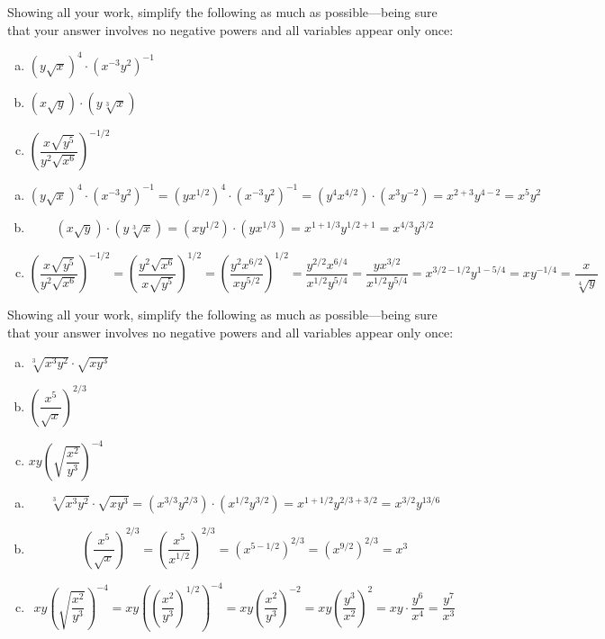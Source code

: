 \documentclass[11pt,letterpaper]{article}
\begin{document}
\newpage



 Showing all your work, simplify the following as much as possible---being sure that your answer involves no negative powers and all variables appear only once:
	\begin{enumerate}[(a)]
	\item $(y \sqrt{x})^4 \cdot (x^{-3} y^2)^{-1}$
	\item $(x \sqrt{y}) \cdot (y \sqrt[3]{x})$
	\item $\left( \dfrac{x \sqrt{y^5}}{y^2 \sqrt{x^6}} \right)^{-1/2}$
	\end{enumerate} \pspace

\sol
\begin{enumerate}[(a)]
\item 
	\[
	(y \sqrt{x})^4 \cdot (x^{-3} y^2)^{-1}= (y x^{1/2})^4 \cdot (x^{-3} y^2)^{-1}= (y^4 x^{4/2}) \cdot (x^3 y^{-2})= x^{2 + 3} y^{4 - 2}= x^5 y^2
	\] \pspace

\item 
	\[
	(x \sqrt{y}) \cdot (y \sqrt[3]{x})= (x y^{1/2}) \cdot (y x^{1/3})= x^{1+1/3} y^{1/2+1}= x^{4/3} y^{3/2}
	\] \pspace

\item 
	\[
	\left( \dfrac{x \sqrt{y^5}}{y^2 \sqrt{x^6}} \right)^{-1/2}= \left( \dfrac{y^2 \sqrt{x^6}}{x \sqrt{y^5}} \right)^{1/2}= \left( \dfrac{y^2 x^{6/2}}{x y^{5/2}} \right)^{1/2}= \dfrac{y^{2/2} x^{6/4}}{x^{1/2} y^{5/4}}= \dfrac{y x^{3/2}}{x^{1/2} y^{5/4}}= x^{3/2-1/2} y^{1-5/4}= x y^{-1/4}= \dfrac{x}{\sqrt[4]{y}}
	\]
\end{enumerate}



\newpage



 Showing all your work, simplify the following as much as possible---being sure that your answer involves no negative powers and all variables appear only once:
	\begin{enumerate}[(a)]
	\item $\sqrt[3]{x^3 y^2} \cdot \sqrt{x y^3}$
	\item $\left( \dfrac{x^5}{\sqrt{x}} \right)^{2/3}$
	\item $xy \left( \sqrt{\dfrac{x^2}{y^3}} \right)^{-4}$
	\end{enumerate} \pspace

\sol
\begin{enumerate}[(a)]
\item 
	\[
	\sqrt[3]{x^3 y^2} \cdot \sqrt{x y^3}= (x^{3/3} y^{2/3}) \cdot (x^{1/2} y^{3/2})= x^{1+1/2} y^{2/3+3/2}= x^{3/2} y^{13/6}
	\] \pspace

\item 
	\[
	\left( \dfrac{x^5}{\sqrt{x}} \right)^{2/3}= \left( \dfrac{x^5}{x^{1/2}} \right)^{2/3}= (x^{5-1/2})^{2/3}= (x^{9/2})^{2/3}= x^3
	\] \pspace

\item 
	\[
	xy \left( \sqrt{\dfrac{x^2}{y^3}} \right)^{-4}= xy \left( \left( \dfrac{x^2}{y^3} \right)^{1/2} \right)^{-4}= xy \left( \dfrac{x^2}{y^3} \right)^{-2}= xy \left( \dfrac{y^3}{x^2} \right)^2= xy \cdot \dfrac{y^6}{x^4}= \dfrac{y^7}{x^3}
	\]
\end{enumerate}
\end{document}
